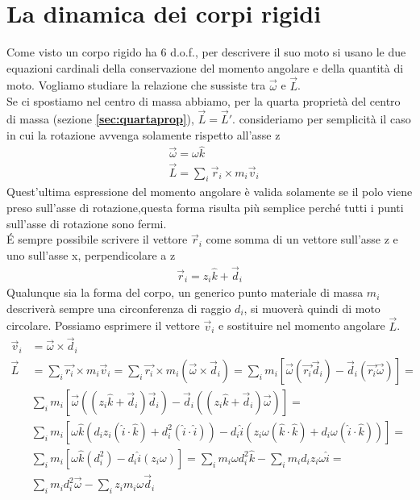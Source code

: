 \section{La dinamica dei corpi rigidi}
Come visto un corpo rigido ha 6 d.o.f., per descrivere il suo moto si usano le due equazioni cardinali della conservazione del momento angolare e della quantità di moto. Vogliamo studiare la relazione che sussiste tra $\vec{\omega}$ e $\vec{L}$.\\
Se ci spostiamo nel centro di massa abbiamo, per la quarta proprietà del centro di massa (sezione \textbf{\ref{sec:quartaprop}}), $\vec{L} = \vec{L}'$. consideriamo per semplicità il caso in cui la rotazione avvenga solamente rispetto all'asse z
\begin{align*}
	&\vec{\omega}=\omega \hat{k}\\
	&\vec{L}=\sum_i \vec{r}_i \times m_i \vec{v}_i
\end{align*} 
Quest'ultima espressione del momento angolare è valida solamente se il polo viene preso sull'asse di rotazione,questa forma risulta più semplice perché tutti i punti sull'asse di rotazione sono fermi.\\
\'{E} sempre possibile scrivere il vettore $\vec{r}_i$ come somma di un vettore sull'asse z e uno sull'asse x, perpendicolare a z
\begin{align*}
	\vec{r}_i = z_i \hat{k} + \vec{d}_i
\end{align*}
Qualunque sia la forma del corpo, un generico punto materiale di massa $m_i$ descriverà sempre una circonferenza di raggio $d_i$, si muoverà quindi di moto circolare. Possiamo esprimere il vettore $\vec{v}_i$ e sostituire nel momento angolare $\vec{L}$. 
\begin{align*}
	\vec{v}_i &= \vec{\omega}\times \vec{d}_i\\
	\vec{L} &= \sum_i \vec{r_i} \times m_i \vec{v}_i = \sum_i \vec{r_i} \times m_i (\vec{\omega}\times \vec{d}_i) = \sum_i m_i[\vec{\omega}(\vec{r_i}\vec{d}_i)-\vec{d}_i(\vec{r_i}\vec{\omega})]= \\
	& \sum_i m_i[\vec{\omega}((z_i \hat{k} + \vec{d}_i)\vec{d}_i)-\vec{d}_i((z_i \hat{k} + \vec{d}_i)\vec{\omega})]=\\
	&\sum_i m_i[\omega \hat{k}(d_i z_i (\hat{i} \cdot \hat{k})+d_i^2(\hat{i}\cdot \hat{i}))-d_i \hat{i}(z_i \omega (\hat{k} \cdot \hat{k})+ d_i \omega (\hat{i}\cdot \hat{k}))]=\\
	&\sum_i m_i[\omega \hat{k}(d_i^2)-d_i \hat{i}(z_i \omega)] = \sum_i m_i \omega d_i^2 \hat{k} - \sum_i m_i d_i z_i \omega \hat{i}=\\
	& \sum_i m_i d_i^2 \vec{\omega}- \sum_i z_i m_i \omega \vec{d}_i 
\end{align*} 

